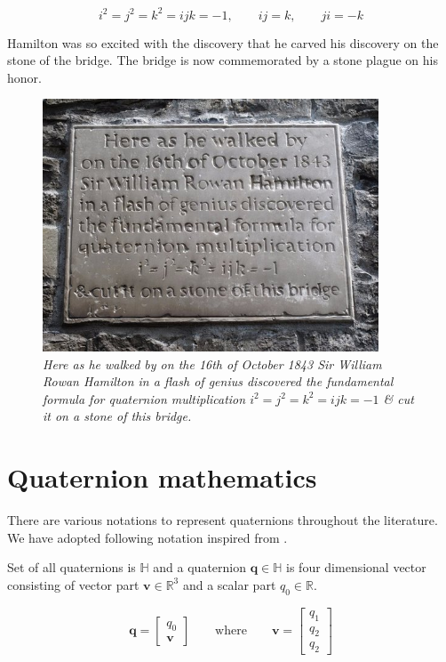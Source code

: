 \documentclass[12pt]{article}
\begin{document}
\begin{equation}
    i^{2} = j^{2} = k^{2} = ijk =  -1, \quad \quad ij = k, \quad \quad ji = -k
\end{equation}

Hamilton was so excited with the discovery that he carved his discovery on the stone of the bridge. The bridge is now commemorated by a stone plague on his honor.

\begin{figure}[hbt!]
    \begin{center}
    \includegraphics[width = 10cm]{figs/fig_bridge.jpg}
    \caption*{\centering \textit{Here as he walked by on the 16th of October 1843 Sir William Rowan Hamilton in a flash of genius discovered the fundamental formula for quaternion multiplication $i^{2} = j^{2} = k^{2} = ijk =  -1$ \& cut it on a stone of this bridge.}}
    \end{center}
\end{figure}

\section{Quaternion mathematics}
There are various notations to represent quaternions throughout the literature. We have adopted following notation inspired from \cite{markley2014}.

Set of all quaternions is $\mathbb{H}$ and a quaternion $\bm{q} \in \mathbb{H}$ is four dimensional vector consisting of vector part $\bm{v} \in \mathbb{R}^{3}$ and a scalar part $q_{0} \in \mathbb{R}$.

\begin{equation}
    \bm{q} = \begin{bmatrix} q_{0} \\ \bm{v} \end{bmatrix}
    \quad \quad \text{where} \quad \quad
    \bm{v} = \begin{bmatrix} q_{1} \\ q_{2} \\ q_{2} \end{bmatrix}
    \label{eqn_quat_notation}
\end{equation}
\end{document}
